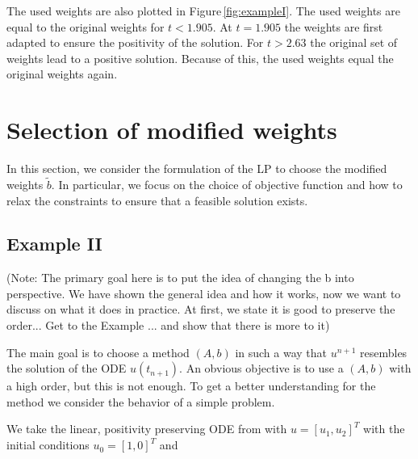 \documentclass[a4paper]{article}
\numberwithin{equation}{section}
\theoremstyle{plain}
\theoremstyle{definition}
\numberwithin{theorem}{section}
\newcommand{\1}{\mathbbm{1}}
\newcommand{\bt}{\tilde{b}}
\begin{document}
The used weights are also plotted in Figure\,\ref{fig:exampleI}. 
The used weights are equal to the original weights for $t<1.905$. At $t=1.905$ the weights are first adapted to ensure the positivity of the solution. For $t>2.63$ the original set of weights lead to a positive solution. Because of this, the used weights equal the original weights again.


\section{Selection of modified weights}\label{sec:LP}

In this section, we consider the formulation of the LP to choose
the modified weights $\bt$.  In particular, we focus on the choice
of objective function and how to relax the constraints to ensure that
a feasible solution exists.

\subsection{Example II}\label{sec:example_lin}

(Note: The primary goal here is to put the idea of changing the b into perspective. We have shown the general idea and how it works, now we want to discuss on what it does in practice. At first, we state it is good to preserve the order... Get to the Example ... and show that there is more to it)


The main goal is to choose a method $(A,b)$ in such a way that $u^{n+1}$ resembles the solution of the ODE $u(t_{n+1})$.
An obvious objective is to use a $(A,b)$ with a high order, but this is not enough.
To get a better understanding for the method we consider the behavior of a simple problem.   

We take the linear, positivity preserving ODE from \cite{kopecz_unconditionally_2018} with $u = [u_1,u_2]^T$ with the initial conditions $u_0 = [1,0]^T$ and
\end{document}
